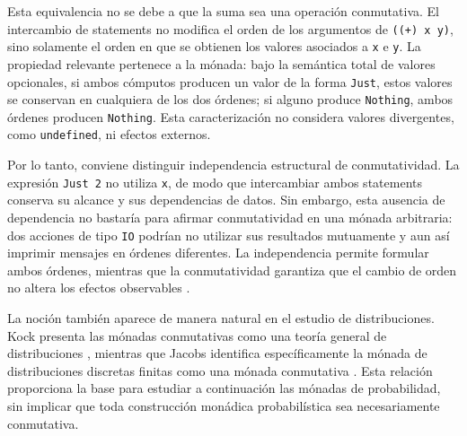 Esta equivalencia no se debe a que la suma sea una operación conmutativa. El intercambio de statements no modifica el orden de los argumentos de \verb|((+) x y)|, sino solamente el orden en que se obtienen los valores asociados a \texttt{x} e \texttt{y}. La propiedad relevante pertenece a la mónada: bajo la semántica total de valores opcionales, si ambos cómputos producen un valor de la forma \texttt{Just}, estos valores se conservan en cualquiera de los dos órdenes; si alguno produce \texttt{Nothing}, ambos órdenes producen \texttt{Nothing}. Esta caracterización no considera valores divergentes, como \texttt{undefined}, ni efectos externos.

Por lo tanto, conviene distinguir independencia estructural de conmutatividad. La expresión \texttt{Just 2} no utiliza \texttt{x}, de modo que intercambiar ambos statements conserva su alcance y sus dependencias de datos. Sin embargo, esta ausencia de dependencia no bastaría para afirmar conmutatividad en una mónada arbitraria: dos acciones de tipo \texttt{IO} podrían no utilizar sus resultados mutuamente y aun así imprimir mensajes en órdenes diferentes. La independencia permite formular ambos órdenes, mientras que la conmutatividad garantiza que el cambio de orden no altera los efectos observables \cite[p.~94]{MarlowPJKM2016}.

La noción también aparece de manera natural en el estudio de distribuciones. Kock presenta las mónadas conmutativas como una teoría general de distribuciones \cite{Kock2012}, mientras que Jacobs identifica específicamente la mónada de distribuciones discretas finitas como una mónada conmutativa \cite[sección~3.1]{Jacobs2018}. Esta relación proporciona la base para estudiar a continuación las mónadas de probabilidad, sin implicar que toda construcción monádica probabilística sea necesariamente conmutativa.
